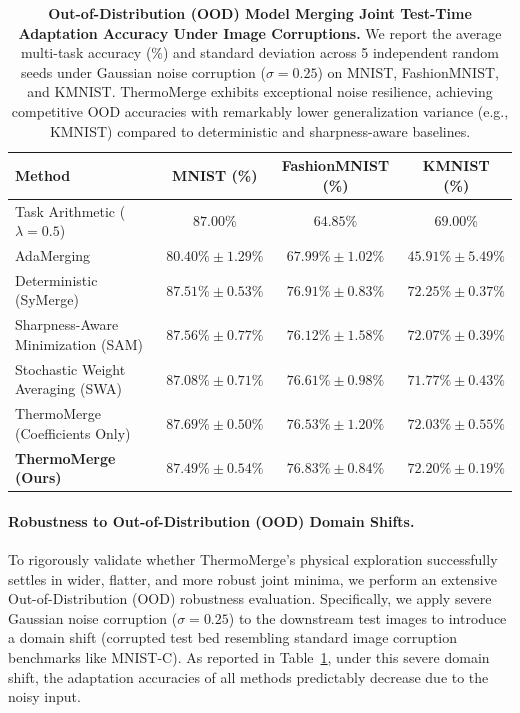 \begin{table}[t]
\caption{\textbf{Out-of-Distribution (OOD) Model Merging Joint Test-Time Adaptation Accuracy Under Image Corruptions.} We report the average multi-task accuracy (\%) and standard deviation across 5 independent random seeds under Gaussian noise corruption ($\sigma=0.25$) on MNIST, FashionMNIST, and KMNIST. ThermoMerge exhibits exceptional noise resilience, achieving competitive OOD accuracies with remarkably lower generalization variance (e.g., KMNIST) compared to deterministic and sharpness-aware baselines.}
\label{tab:ood_results}
\vskip 0.15in
\begin{center}
\begin{small}
\begin{sc}
\begin{tabular}{lccc}
\toprule
Method & MNIST (\%) & FashionMNIST (\%) & KMNIST (\%) \\
\midrule
Task Arithmetic ($\lambda=0.5$) & $87.00\%$ & $64.85\%$ & $69.00\%$ \\
AdaMerging~\cite{yang2024adamerging} & $80.40\% \pm 1.29\%$ & $67.99\% \pm 1.02\%$ & $45.91\% \pm 5.49\%$ \\
Deterministic (SyMerge) & $87.51\% \pm 0.53\%$ & $\mathbf{76.91\% \pm 0.83\%}$ & $\mathbf{72.25\% \pm 0.37\%}$ \\
Sharpness-Aware Minimization (SAM) & $87.56\% \pm 0.77\%$ & $76.12\% \pm 1.58\%$ & $72.07\% \pm 0.39\%$ \\
Stochastic Weight Averaging (SWA) & $87.08\% \pm 0.71\%$ & $76.61\% \pm 0.98\%$ & $71.77\% \pm 0.43\%$ \\
ThermoMerge (Coefficients Only) & $\mathbf{87.69\% \pm 0.50\%}$ & $76.53\% \pm 1.20\%$ & $72.03\% \pm 0.55\%$ \\
\textbf{ThermoMerge (Ours)} & $87.49\% \pm 0.54\%$ & $76.83\% \pm 0.84\%$ & $72.20\% \pm \mathbf{0.19\%}$ \\
\bottomrule
\end{tabular}
\end{sc}
\end{small}
\end{center}
\vskip -0.1in
\end{table}

\paragraph{Robustness to Out-of-Distribution (OOD) Domain Shifts.} To rigorously validate whether ThermoMerge's physical exploration successfully settles in wider, flatter, and more robust joint minima, we perform an extensive Out-of-Distribution (OOD) robustness evaluation.
Specifically, we apply severe Gaussian noise corruption ($\sigma=0.25$) to the downstream test images to introduce a domain shift (corrupted test bed resembling standard image corruption benchmarks like MNIST-C).
As reported in Table~\ref{tab:ood_results}, under this severe domain shift, the adaptation accuracies of all methods predictably decrease due to the noisy input.


